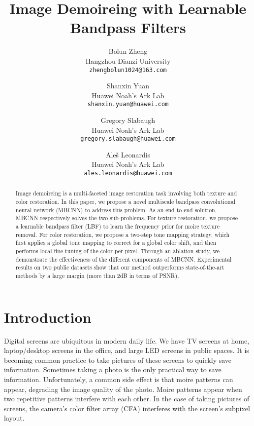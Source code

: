 \documentclass[10pt,twocolumn,letterpaper]{article}
\begin{document}
\title{Image Demoireing with Learnable Bandpass Filters}

\author{\normalsize Bolun Zheng\\
\footnotesize Hangzhou Dianzi University\\
{\tt\scriptsize zhengbolun1024@163.com}
\and
\normalsize Shanxin Yuan\\
\footnotesize Huawei Noah's Ark Lab\\
{\tt\scriptsize shanxin.yuan@huawei.com}
\and
\normalsize Gregory Slabaugh\\
\footnotesize Huawei Noah's Ark Lab\\
{\tt\scriptsize gregory.slabaugh@huawei.com}
\and
\normalsize Ale\v{s} Leonardis\\
\footnotesize Huawei Noah's Ark Lab\\
{\tt\scriptsize ales.leonardis@huawei.com}
\and
}

\maketitle


\begin{abstract}
Image demoireing is a multi-faceted image restoration task involving both texture and color restoration. 
In this paper, we propose a novel multiscale bandpass convolutional neural network (MBCNN) to address this problem. 
As an end-to-end solution, MBCNN respectively solves the two sub-problems.
For texture restoration, we propose a learnable bandpass filter (LBF) to learn the frequency prior for moire texture removal.
For color restoration, we propose a two-step tone mapping strategy, which first applies a global tone mapping to correct for a global color shift, and then performs local fine tuning of the color per pixel.
Through an ablation study, we demonstrate the effectiveness of the different components of MBCNN. 
Experimental results on two public datasets show that our method outperforms state-of-the-art methods by a large margin (more than 2dB in terms of PSNR).
\end{abstract}

\section{Introduction}
Digital screens are ubiquitous in modern daily life. We have TV screens at home, laptop/desktop screens in the office, and large LED screens in public spaces. It is becoming common practice to take pictures of these screens to quickly save information. Sometimes taking a photo is the only practical way to save information.
Unfortunately, a common side effect is that moire patterns can appear, degrading the image quality of the photo. 
Moire patterns appear when two repetitive patterns interfere with each other. In the case of taking pictures of screens, the camera’s color filter array (CFA) interferes with the screen's subpixel layout.
\end{document}
